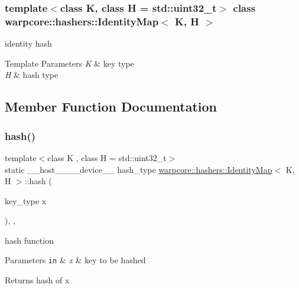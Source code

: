 \subsubsection*{template$<$class K, class H = std\+::uint32\+\_\+t$>$\newline
class warpcore\+::hashers\+::\+Identity\+Map$<$ K, H $>$}

identity hash 


\begin{DoxyTemplParams}{Template Parameters}
{\em K} & key type \\
\hline
{\em H} & hash type \\
\hline
\end{DoxyTemplParams}


\subsection{Member Function Documentation}
\mbox{\label{classwarpcore_1_1hashers_1_1IdentityMap_a916ddad468ba57f3ce81e74c1ef8e57a}} 
\subsubsection{\texorpdfstring{hash()}{hash()}}
{\footnotesize\ttfamily template$<$class K , class H  = std\+::uint32\+\_\+t$>$ \\
static \+\_\+\+\_\+host\+\_\+\+\_\+\+\_\+\+\_\+device\+\_\+\+\_\+ hash\+\_\+type \hyperlink{classwarpcore_1_1hashers_1_1IdentityMap}{warpcore\+::hashers\+::\+Identity\+Map}$<$ K, H $>$\+::hash (\begin{DoxyParamCaption}\item[{key\+\_\+type}]{x }\end{DoxyParamCaption})\hspace{0.3cm}{\ttfamily [inline]}, {\ttfamily [static]}, {\ttfamily [noexcept]}}



hash function 


\begin{DoxyParams}[1]{Parameters}
\mbox{\tt in}  & {\em x} & key to be hashed \\
\hline
\end{DoxyParams}
\begin{DoxyReturn}{Returns}
hash of {\ttfamily x} 
\end{DoxyReturn}
